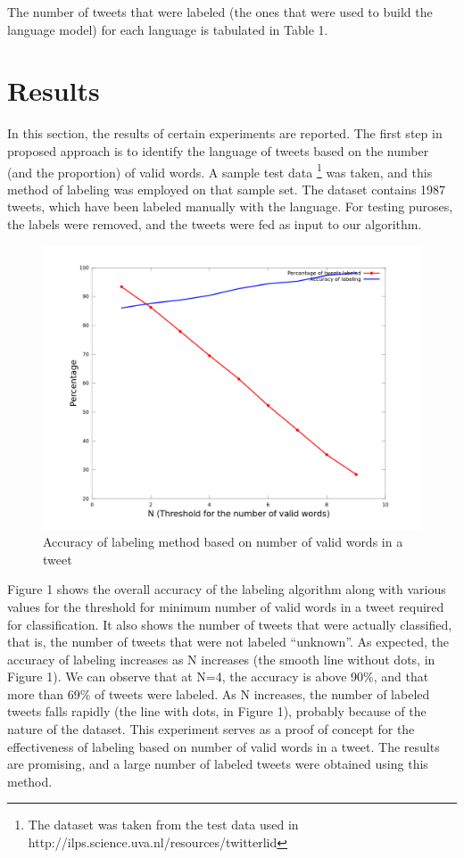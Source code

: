 \documentclass[11pt]{article}
\begin{document}
The number of tweets that were labeled (the ones that were used to build the language model) for each language is tabulated in Table 1.




\section{Results}
In this section, the results of certain experiments are reported. The first step in proposed approach is to identify the language of tweets based on the number (and the proportion) of valid words. A sample test data \footnote[3]{The dataset was taken from the test data used in http://ilps.science.uva.nl/resources/twitterlid} was taken, and this method of labeling was employed on that sample set. The dataset contains 1987 tweets, which have been labeled manually with the language. For testing puroses, the labels were removed, and the tweets were fed as input to our algorithm.

\begin{figure}[ht]
\includegraphics[scale=0.18]{accuracy_words.png}
\caption{\footnotesize Accuracy of labeling method based on number of valid words in a tweet}
\label{fig:s2}
\end{figure}


Figure 1 shows the overall accuracy of the labeling algorithm along with various values for the threshold for minimum number of valid words in a tweet required for classification. It also shows the number of tweets that were actually classified, that is, the number of tweets that were not labeled ``unknown''. As expected, the accuracy of labeling increases as N increases (the smooth line without dots, in Figure 1). We can observe that at N=4, the accuracy is above 90\%, and that more than 69\% of tweets were labeled. As N increases, the number of labeled tweets falls rapidly (the line with dots, in Figure 1), probably because of the nature of the dataset. This experiment serves as a proof of concept for the effectiveness of labeling based on number of valid words in a tweet. The results are promising, and a large number of labeled tweets were obtained using this method.
\end{document}
